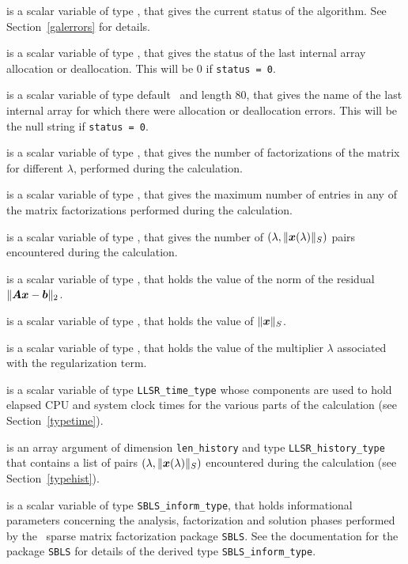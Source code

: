\documentclass{galahad}
\newcommand{\packagename}{LLSR}
\begin{document}
\begin{description}
 is a scalar variable of type \integer, that gives the
current status of the algorithm. See Section~\ref{galerrors} for details.

 is a scalar variable of type \integer,
that gives the status of the last internal array allocation
or deallocation. This will be 0 if {\tt status = 0}.

 is a scalar variable of type default \character\
and length 80, that  gives the name of the last internal array
for which there were allocation or deallocation errors.
This will be the null string if {\tt status = 0}.

 is a scalar variable of type \integer, that
gives the number of factorizations of the matrix \req{kkt}
for different $\lambda$, performed during the calculation.

 is a scalar variable of type \integer, that
gives the maximum number of entries in any of the matrix factorizations
performed during the calculation.

 is a scalar variable of type \integer, that gives
the number of $(\lambda,\|{\bm{x}}(\lambda)\|_S)$ pairs encountered during the
calculation.

 is a scalar variable of type \realdp, that holds the
value of the norm of the residual $\| {\bm{A}} {\bm{x}} - {\bm{b}}\|_2$.

 is a scalar variable of type \realdp,
that holds the value of $\|{\bm{x}}\|_S$.

 is a scalar variable of type \realdp, that holds the
value of the multiplier $\lambda$ associated with the 
regularization term.

 is a scalar variable of type {\tt \packagename\_time\_type}
whose components are used to hold elapsed CPU  and system clock times for the
various parts of the calculation (see Section~\ref{typetime}).

 is an array argument of dimension {\tt len\_history} and
type {\tt \packagename\_history\_type} that contains a list of pairs
$(\lambda,\|{\bm{x}}(\lambda)\|_S)$ encountered during the
calculation (see Section~\ref{typehist}).

 is a scalar variable of type {\tt SBLS\_inform\_type},
that holds informational parameters concerning the analysis, factorization
and solution phases performed by
the \galahad\ sparse matrix factorization package {\tt SBLS}.
See the documentation for the package {\tt SBLS} for details of the
derived type {\tt SBLS\_inform\_type}.


\end{description}
\end{document}
